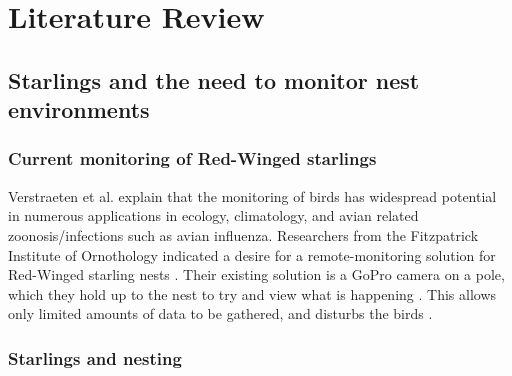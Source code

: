 \documentclass[class=report,11pt,crop=false]{standalone}
\begin{document}
\ifstandalone
\tableofcontents
\fi
\chapter{Literature Review \label{ch:literature}}



\section{Starlings and the need to monitor nest environments}

\subsection{Current monitoring of Red-Winged starlings}

Verstraeten et al. \cite{verstraeten2010webcams} explain that the monitoring of birds has widespread potential in numerous applications in ecology, climatology, and avian related zoonosis/infections such as avian influenza. Researchers from the Fitzpatrick Institute of Ornothology indicated a desire for a remote-monitoring solution for Red-Winged starling nests \cite{hofmeyer2024private}. Their existing solution is a GoPro camera on a pole, which they hold up to the nest to try and view what is happening \cite{hofmeyer2024private}. This allows only limited amounts of data to be gathered, and disturbs the birds \cite{hofmeyer2024private}.

\subsection{Starlings and nesting}
\end{document}
